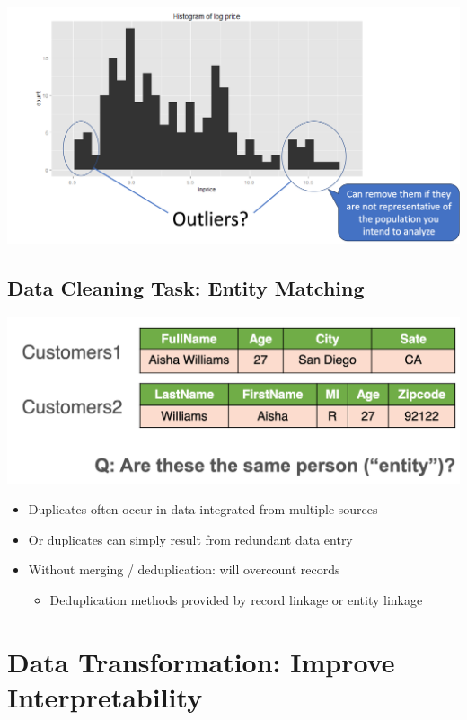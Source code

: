 \documentclass[11pt]{article}
\theoremstyle{definition}
\begin{document}
\includegraphics[width=\textwidth]{16.png}
\subsection{Data Cleaning Task: Entity Matching}
\includegraphics[width=\textwidth]{17.png}
\begin{itemize}
    \item Duplicates often occur in data integrated from multiple sources
    \item Or duplicates can simply result from redundant data entry
    \item Without merging / deduplication: will overcount records
    \begin{itemize}
        \item Deduplication methods provided by record linkage or entity linkage
    \end{itemize}
\end{itemize}
\newpage
\section{Data Transformation:
Improve Interpretability}
\end{document}
